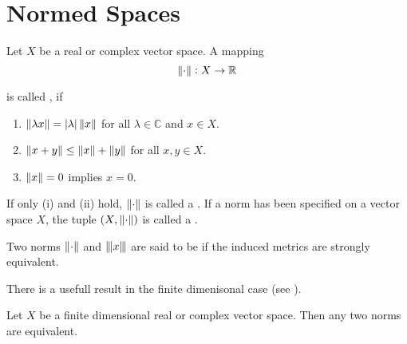 \section{Normed Spaces}

\begin{definition}
	Let $X$ be a real or complex vector space. A mapping 
	\begin{equation}
		\norm[0]{\cdot}: X \to \mathbb{R}
	\end{equation}

	\noindent is called , if

	\begin{enumerate}
		\item $\norm[0]{\lambda x} = \abs[0]{\lambda}\norm[0]{x}$ for all $\lambda \in \mathbb{C}$ and $x \in X$.
		\item $\norm[0]{x + y} \leq \norm[0]{x} + \norm[0]{y}$ for all $x,y \in X$.
		\item $\norm[0]{x} = 0$ implies $x = 0$.
	\end{enumerate}

	If only \textup{(}i\textup{)} and \textup{(}ii\textup{)} hold, $\norm[0]{\cdot}$ is called a . If a norm has been specified on a vector space $X$, the tuple $(X,\norm[0]{\cdot})$ is called a .
\end{definition}

\begin{definition}
	Two norms $\norm[0]{\cdot}$ and $\trinorm[0]{x}$ are said to be  if the induced metrics are strongly equivalent.
\end{definition}

There is a usefull result in the finite dimenisonal case (see \cite[26]{werner:funktionalanalysis:2011}).

\begin{theorem}
	Let $X$ be a finite dimensional real or complex vector space. Then any two norms are equivalent.
	\label{thm:equivalence_norms}
\end{theorem}

